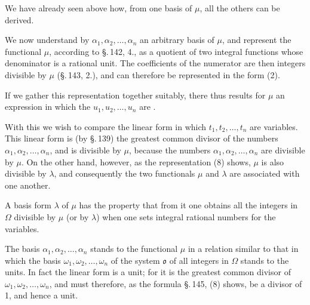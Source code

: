 
We have already seen above how, from one basis of $\mu$, all the
others can be derived.

We now understand by $\alpha_1, \alpha_2, \ldots, \alpha_n$ an
arbitrary basis of $\mu$, and represent the functional $\mu$,
according to \S.\,142, 4., as a quotient of two integral functions
whose denominator is a rational unit. The coefficients of the
numerator are then integers divisible by $\mu$ (\S.\,143, 2.), and can
therefore be represented in the form (2).

If we gather this representation together suitably, there thus results
for $\mu$ an expression
in which the $u_1, u_2, \ldots, u_n$ are .

With this we wish to compare the linear form
in which $t_1, t_2, \ldots, t_n$ are variables. This linear form is
(by \S.\,139) the greatest common divisor of the numbers
$\alpha_1, \alpha_2, \ldots, \alpha_n$, and is divisible by $\mu$,
because the numbers $\alpha_1, \alpha_2, \ldots, \alpha_n$ are
divisible by $\mu$. On the other hand, however, as the representation
(8) shows, $\mu$ is also divisible by $\lambda$, and consequently the
two functionals $\mu$ and $\lambda$ are associated with one another.


A basis form $\lambda$ of $\mu$ has the property that from
it one obtains all the integers in $\Omega$ divisible by $\mu$ (or by
$\lambda$) when one sets integral rational numbers for the
variables.

The basis $\alpha_1, \alpha_2, \ldots, \alpha_n$ stands to the
functional $\mu$ in a relation similar to that in which the basis
$\omega_1, \omega_2, \ldots, \omega_n$ of the system $\mathfrak{o}$ of all
integers in $\Omega$ stands to the units. In fact the linear form
is a unit; for it is the greatest common divisor of
$\omega_1, \omega_2, \ldots, \omega_n$, and must therefore, as the
formula \S.\,145, (8) shows, be a divisor of 1, and hence a unit.

